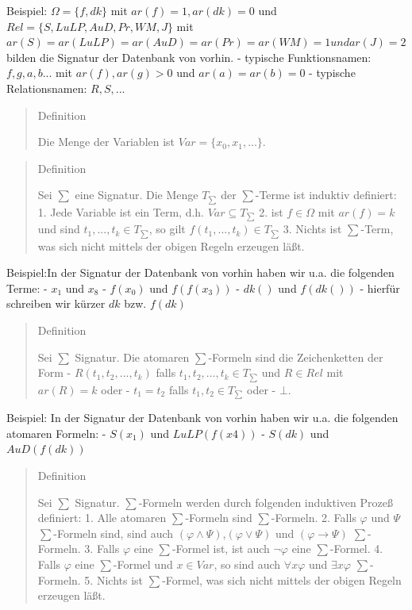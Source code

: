 \documentclass[a4paper]{article}
\begin{document}
\begin{multicols}{3}
  Beispiel: $\Omega=\{f,dk\}$ mit $ar(f) =1,ar(dk)=0$ und
  $Rel=\{S,LuLP,AuD,Pr,WM,J\}$ mit
  $ar(S) =ar(LuLP) =ar(AuD) =ar(Pr) =ar(WM) =1 undar(J) = 2$ bilden die
  Signatur der Datenbank von vorhin. - typische Funktionsnamen:
  $f, g, a, b...$ mit $ar(f),ar(g) > 0$ und $ar(a) =ar(b) = 0$ - typische
  Relationsnamen: $R,S,...$

  \begin{quote}
    Definition

    Die Menge der Variablen ist $Var=\{x_0,x_1 ,...\}$.
  \end{quote}

  \begin{quote}
    Definition

    Sei $\sum$ eine Signatur. Die Menge $T_{\sum}$ der $\sum$-Terme ist
    induktiv definiert: 1. Jede Variable ist ein Term, d.h.
    $Var\subseteq T_{\sum}$ 2. ist $f\in\Omega$ mit $ar(f)=k$ und sind
    $t_1,...,t_k\in T_{\sum}$, so gilt $f(t_1,...,t_k)\in T_{\sum}$ 3.
    Nichts ist $\sum$-Term, was sich nicht mittels der obigen Regeln
    erzeugen läßt.
  \end{quote}

  Beispiel:In der Signatur der Datenbank von vorhin haben wir u.a. die
  folgenden Terme: - $x_1$ und $x_8$ - $f(x_0)$ und $f(f(x_3))$ - $dk()$
  und $f(dk())$ - hierfür schreiben wir kürzer $dk$ bzw. $f(dk)$

  \begin{quote}
    Definition

    Sei $\sum$ Signatur. Die atomaren $\sum$-Formeln sind die Zeichenketten
    der Form - $R(t_1,t_2,...,t_k)$ falls $t_1,t_2,...,t_k\in T_{\sum}$ und
    $R\in Rel$ mit $ar(R)=k$ oder - $t_1=t_2$ falls $t_1,t_2\in T_{\sum}$
    oder - $\bot$.
  \end{quote}

  Beispiel: In der Signatur der Datenbank von vorhin haben wir u.a. die
  folgenden atomaren Formeln: - $S(x_1)$ und $LuLP(f(x4))$ - $S(dk)$ und
  $AuD(f(dk))$

  \begin{quote}
    Definition

    Sei $\sum$ Signatur. $\sum$-Formeln werden durch folgenden induktiven
    Prozeß definiert: 1. Alle atomaren $\sum$-Formeln sind $\sum$-Formeln.
    2. Falls $\varphi$ und $\Psi$ $\sum$-Formeln sind, sind auch
    $(\varphi\wedge\Psi)$,$(\varphi\vee\Psi)$ und $(\varphi\rightarrow\Psi)$
    $\sum$-Formeln. 3. Falls $\varphi$ eine $\sum$-Formel ist, ist auch
    $\lnot\varphi$ eine $\sum$-Formel. 4. Falls $\varphi$ eine $\sum$-Formel
    und $x\in Var$, so sind auch $\forall x\varphi$ und $\exists x\varphi$
    $\sum$-Formeln. 5. Nichts ist $\sum$-Formel, was sich nicht mittels der
    obigen Regeln erzeugen läßt.
  \end{quote}


\end{multicols}
\end{document}
